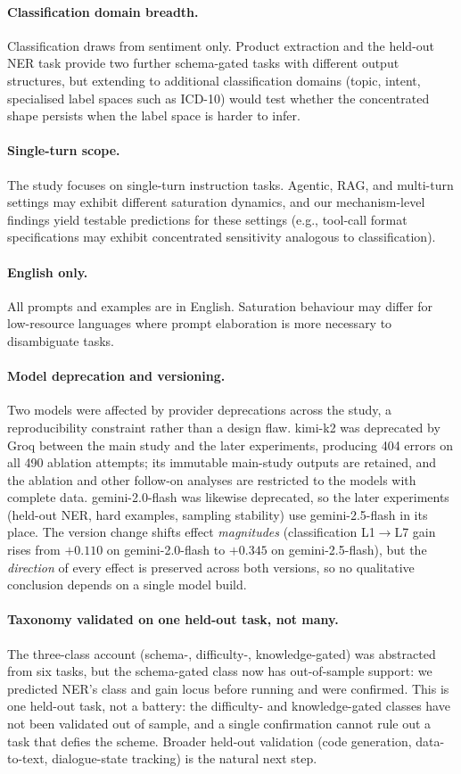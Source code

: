 \paragraph{Classification domain breadth.}
Classification draws from sentiment only. Product extraction and the held-out
NER task provide two further schema-gated tasks with different output
structures, but extending to additional classification domains (topic, intent,
specialised label spaces such as ICD-10) would test whether the concentrated
shape persists when the label space is harder to infer.

\paragraph{Single-turn scope.}
The study focuses on single-turn instruction tasks.
Agentic, RAG, and multi-turn settings may exhibit different saturation
dynamics, and our mechanism-level findings yield testable predictions for
these settings (e.g., tool-call format specifications may exhibit
concentrated sensitivity analogous to classification).

\paragraph{English only.}
All prompts and examples are in English.
Saturation behaviour may differ for low-resource languages where prompt
elaboration is more necessary to disambiguate tasks.

\paragraph{Model deprecation and versioning.}
Two models were affected by provider deprecations across the study, a
reproducibility constraint rather than a design flaw.
kimi-k2 was deprecated by Groq between the main study and the later
experiments, producing 404 errors on all 490 ablation attempts; its
immutable main-study outputs are retained, and the ablation and other
follow-on analyses are restricted to the models with complete data.
gemini-2.0-flash was likewise deprecated, so the later experiments
(held-out NER, hard examples, sampling stability) use gemini-2.5-flash in its
place.
The version change shifts effect \emph{magnitudes} (classification L1$\to$L7
gain rises from $+0.110$ on gemini-2.0-flash to $+0.345$ on gemini-2.5-flash),
but the \emph{direction} of every effect is preserved across both versions, so
no qualitative conclusion depends on a single model build.

\paragraph{Taxonomy validated on one held-out task, not many.}
The three-class account (schema-, difficulty-, knowledge-gated) was abstracted
from six tasks, but the schema-gated class now has out-of-sample support: we
predicted NER's class and gain locus before running and were confirmed. This is
one held-out task, not a battery: the difficulty- and knowledge-gated classes
have not been validated out of sample, and a single confirmation cannot rule
out a task that defies the scheme. Broader held-out validation (code generation,
data-to-text, dialogue-state tracking) is the natural next step.
